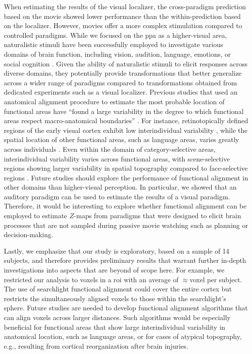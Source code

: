 %
When estimating the results of the visual localizer, the cross-paradigm
prediction based on the movie showed lower performance than the
within-prediction based on the localizer.
%
However, movies offer a more complex stimulation compared to controlled
paradigms.
%
While we focused on the \ac{ppa} as a higher-visual area, naturalistic stimuli
have been successfully employed to investigate various domains of brain
function, including vision, audition, language, emotions, or social cognition
\citep[s.][for a review]{jaaskelainen2021movies}.
%
Given the ability of naturalistic stimuli to elicit responses across diverse
domains, they potentially provide transformations that better generalize across
a wider range of paradigms compared to transformations obtained from dedicated
experiments such as a visual localizer.
%
Previous studies that used an anatomical alignment procedure to estimate the
most probable location of functional areas have ``found a large variability in
the degree to which functional areas respect macro-anatomical boundaries''
\citep[][p. 1369]{frost2012measuring}.
%
For instance, retinotopically defined regions of the early visual cortex exhibit
low interindividual variability \citep{rosenke2021probabilistic}, while the
spatial location of other functional areas, such as language areas, varies
greatly across individuals \citep{frost2012measuring}.
%
Even within the domain of category-selective areas, interindividual variability
varies across functional areas, with scene-selective regions showing larger
variability in spatial topography compared to face-selective regions
\citep{zhen2015quantifying, zhen2017quantifying, frost2012measuring}.
%
Future studies should explore the performance of functional alignment in other
domains than higher-visual perception.
%
In particular, we showed that an auditory paradigm can be used to estimate the
results of a visual paradigm.
%
Therefore, it would be interesting to explore whether functional alignment can
be employed to estimate $Z$-maps from paradigms that were designed to elicit
brain processes that are not sampled during passive movie watching such as
planning or decision-making.

%
Lastly, we emphasize that our study is exploratory, based on a sample of 14
subjects, and therefore provides preliminary results that warrant further
in-depth investigations into aspects that are beyond of scope here.
%
For example, we restricted our analysis to voxels in a \ac{roi} with an average
of $\approx$\unit[1600]{voxel} per subject.
%
The use of searchlight functional alignment
\citep[e.g.,][]{zhang2016searchlight, guntupalli2016model} could cover the
entire cortex but restricts the simultaneously aligned voxels to those within
the searchlight's sphere.
%
Future studies are needed to develop functional alignment algorithms that can
align voxels across larger distances.
%
Such algorithms would be especially beneficial for functional areas that show
large interindividual variability in anatomical location, such as language
areas, or for cases of atypical topography, e.g., resulting from cortical
reorganization after brain injuries.

